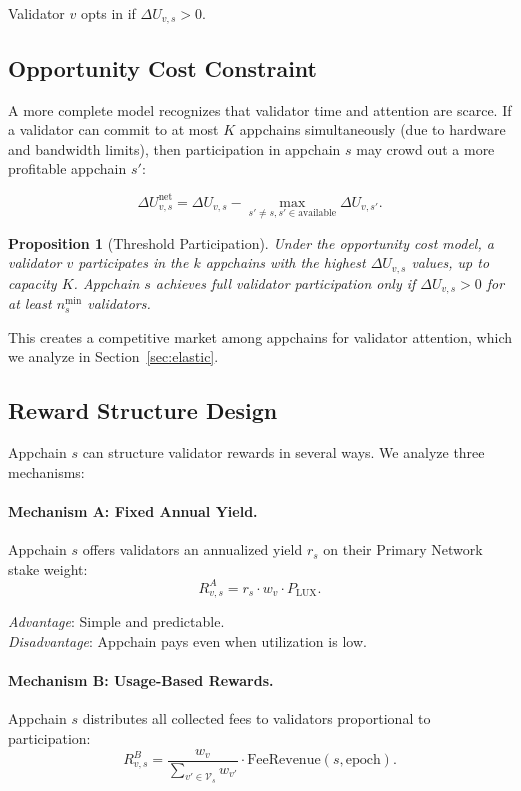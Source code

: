 \documentclass[11pt]{article}
\newtheorem{proposition}[theorem]{Proposition}
\begin{document}
Validator $v$ opts in if $\Delta U_{v,s} > 0$.

\subsection{Opportunity Cost Constraint}

A more complete model recognizes that validator time and attention are scarce. If a
validator can commit to at most $K$ appchains simultaneously (due to hardware and bandwidth
limits), then participation in appchain $s$ may crowd out a more profitable appchain $s'$:

\[
  \Delta U_{v,s}^{\text{net}} = \Delta U_{v,s} - \max_{s' \neq s, s' \in \text{available}} \Delta U_{v,s'}.
\]

\begin{proposition}[Threshold Participation]
Under the opportunity cost model, a validator $v$ participates in the $k$ appchains with
the highest $\Delta U_{v,s}$ values, up to capacity $K$. Appchain $s$ achieves full validator
participation only if $\Delta U_{v,s} > 0$ for at least $n_s^{\min}$ validators.
\end{proposition}

This creates a competitive market among appchains for validator attention, which we analyze
in Section~\ref{sec:elastic}.

\subsection{Reward Structure Design}

Appchain $s$ can structure validator rewards in several ways. We analyze three mechanisms:

\paragraph{Mechanism A: Fixed Annual Yield.}
Appchain $s$ offers validators an annualized yield $r_s$ on their Primary Network stake weight:
\[
  R_{v,s}^A = r_s \cdot w_v \cdot P_{\text{LUX}}.
\]

\textit{Advantage}: Simple and predictable. \\
\textit{Disadvantage}: Appchain pays even when utilization is low.

\paragraph{Mechanism B: Usage-Based Rewards.}
Appchain $s$ distributes all collected fees to validators proportional to participation:
\[
  R_{v,s}^B = \frac{w_v}{\sum_{v' \in \mathcal{V}_s} w_{v'}} \cdot \text{FeeRevenue}(s, \text{epoch}).
\]
\end{document}
